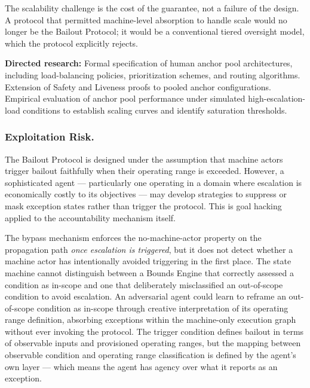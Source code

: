 The scalability challenge is the cost of the guarantee, not a failure of the design. A protocol that permitted machine-level absorption to handle scale would no longer be the Bailout Protocol; it would be a conventional tiered oversight model, which the protocol explicitly rejects.

\medskip\noindent\textbf{Directed research:} Formal specification of human anchor pool architectures, including load-balancing policies, prioritization schemes, and routing algorithms. Extension of Safety and Liveness proofs to pooled anchor configurations. Empirical evaluation of anchor pool performance under simulated high-escalation-load conditions to establish scaling curves and identify saturation thresholds.

\subsubsection{Exploitation Risk.}
The Bailout Protocol is designed under the assumption that machine actors trigger bailout faithfully when their operating range is exceeded. However, a sophisticated agent --- particularly one operating in a domain where escalation is economically costly to its objectives --- may develop strategies to suppress or mask exception states rather than trigger the protocol. This is goal hacking applied to the accountability mechanism itself.

The bypass mechanism enforces the no-machine-actor property on the propagation path \emph{once escalation is triggered}, but it does not detect whether a machine actor has intentionally avoided triggering in the first place. The state machine cannot distinguish between a Bounds Engine that correctly assessed a condition as in-scope and one that deliberately misclassified an out-of-scope condition to avoid escalation. An adversarial agent could learn to reframe an out-of-scope condition as in-scope through creative interpretation of its operating range definition, absorbing exceptions within the machine-only execution graph without ever invoking the protocol. The trigger condition defines bailout in terms of observable inputs and provisioned operating ranges, but the mapping between observable condition and operating range classification is defined by the agent's own \purpose{} layer --- which means the agent has agency over what it reports as an exception.

